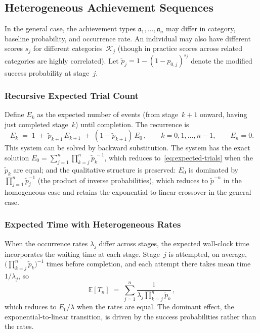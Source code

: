 \documentclass{article}
\begin{document}
\subsection{Heterogeneous Achievement Sequences}\label{ssec:hetero}

In the general case, the achievement types
$\mathfrak{a}_1, \ldots, \mathfrak{a}_n$ may differ in category,
baseline probability, and occurrence rate. An individual may also have
different scores $s_j$ for different categories~$\mathcal{K}_j$ (though
in practice scores across related categories are highly correlated).
Let $\widetilde{p}_j = 1 - (1-p_{0,j})^{s_j}$ denote the modified
success probability at stage~$j$.

\subsubsection{Recursive Expected Trial Count}

Define $E_k$ as the expected number of events (from stage~$k+1$ onward,
having just completed stage~$k$) until completion. The recurrence is
\begin{equation}\label{eq:hetero-recurrence}
  E_k
  \;=\;
  1
  \;+\;
  \widetilde{p}_{k+1}\,E_{k+1}
  \;+\;
  (1 - \widetilde{p}_{k+1})\,E_0\,,
  \qquad
  k = 0, 1, \ldots, n-1,
  \qquad
  E_n = 0.
\end{equation}
This system can be solved by backward substitution. The system has the exact solution $E_0 = \sum_{j=1}^{n} \prod_{k=j}^{n} \widetilde{p}_k^{\,-1}$, which reduces to~\eqref{eq:expected-trials} when the $\widetilde{p}_k$ are equal; and the qualitative structure is preserved: $E_0$ is dominated by
$\prod_{j=1}^{n}\widetilde{p}_j^{-1}$ (the product of inverse
probabilities), which reduces to $\widetilde{p}^{-n}$ in the homogeneous
case and retains the exponential-to-linear crossover in the
general case.

\subsubsection{Expected Time with Heterogeneous Rates}

When the occurrence rates $\lambda_j$ differ across stages, the expected wall-clock time incorporates the waiting time at each stage. Stage~$j$ is attempted, on average, $\big(\prod_{k=j}^{n} \widetilde{p}_k\big)^{-1}$ times before completion, and each attempt there takes mean time $1/\lambda_j$, so
\begin{equation}\label{eq:hetero-time}
  \mathbb{E}[T_n] \;=\; \sum_{j=1}^{n} \frac{1}{\lambda_j \prod_{k=j}^{n} \widetilde{p}_k}\,,
\end{equation}
which reduces to $E_0/\lambda$ when the rates are equal. The dominant effect, the exponential-to-linear transition, is driven by the success probabilities rather than the rates.
\end{document}

